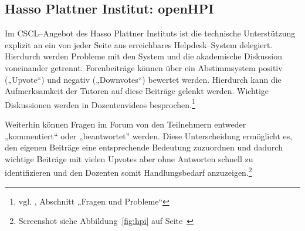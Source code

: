 \subsection{Hasso Plattner Institut: openHPI} %
\label{sub:hasso_plattner_institut}

Im CSCL–Angebot des Hasso Plattner Instituts  ist die technische Unterstützung explizit an ein von jeder Seite aus erreichbares Helpdesk–System delegiert. Hierdurch werden Probleme mit den System und die akademische Diskussion voneinander getrennt. Forenbeiträge können über ein Abstimmsystem positiv („Upvote“) und negativ („Downvotes“) bewertet werden. Hierdurch kann die Aufmerksamkeit der Tutoren auf diese Beiträge gelenkt werden. Wichtige Diskussionen werden in Dozentenvideos besprochen.\footnote{vgl. \cite{hpiintro}, Abschnitt „Fragen und Probleme“}

Weiterhin können Fragen im Forum von den Teilnehmern entweder „kommentiert“ oder „beantwortet” werden. Diese Unterscheidung ermöglicht es, den eigenen Beiträge eine entsprechende Bedeutung zuzuordnen und dadurch wichtige Beiträge mit vielen Upvotes aber ohne Antworten schnell zu identifizieren und den Dozenten somit Handlungsbedarf anzuzeigen.\footnote{Screenshot siehe Abbildung~\ref{fig:hpi} auf Seite~\pageref{fig:hpi}}

